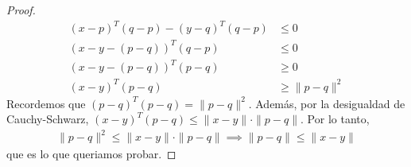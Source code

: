 \documentclass{article}
\begin{document}
\begin{proof}
\begin{align*}
    {(x-p)}^T(q-p) - {(y-q)}^T(q-p) & \leq 0             \\
    {(x-y-(p-q))}^T(q-p)            & \leq 0             \\
    {(x-y-(p-q))}^T (p-q)           & \geq 0             \\
    {(x-y)}^T (p-q)                 & \geq \| p - q \|^2
  \end{align*}
  Recordemos que \( {(p-q)}^T (p-q) = \| p - q \|^2 \). Además, por la desigualdad de Cauchy-Schwarz, \( {(x-y)}^T (p-q) \leq \| x - y \| \cdot \| p - q \| \).
  Por lo tanto, \begin{align*}
    \| p - q \|^2 \leq \| x - y \| \cdot \| p - q \| \implies \| p - q \| \leq \| x - y \|
  \end{align*}
  que es lo que queriamos probar.
\end{proof}


\end{document}
